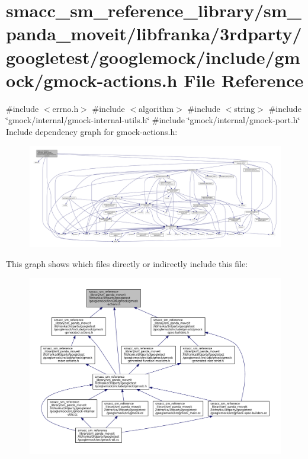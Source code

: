 \hypertarget{gmock-actions_8h}{}\section{smacc\+\_\+sm\+\_\+reference\+\_\+library/sm\+\_\+panda\+\_\+moveit/libfranka/3rdparty/googletest/googlemock/include/gmock/gmock-\/actions.h File Reference}
\label{gmock-actions_8h}
{\ttfamily \#include $<$errno.\+h$>$}\newline
{\ttfamily \#include $<$algorithm$>$}\newline
{\ttfamily \#include $<$string$>$}\newline
{\ttfamily \#include \char`\"{}gmock/internal/gmock-\/internal-\/utils.\+h\char`\"{}}\newline
{\ttfamily \#include \char`\"{}gmock/internal/gmock-\/port.\+h\char`\"{}}\newline
Include dependency graph for gmock-\/actions.h\+:
\nopagebreak
\begin{figure}[H]
\begin{center}
\leavevmode
\includegraphics[width=350pt]{gmock-actions_8h__incl}
\end{center}
\end{figure}
This graph shows which files directly or indirectly include this file\+:
\nopagebreak
\begin{figure}[H]
\begin{center}
\leavevmode
\includegraphics[width=350pt]{gmock-actions_8h__dep__incl}
\end{center}
\end{figure}
